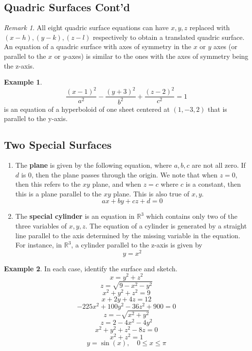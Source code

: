 \documentclass[11pt]{article}
\theoremstyle{plain} %
\theoremstyle{definition}
\theoremstyle{example}
\newtheorem*{example}{Example}
\theoremstyle{remark}
\newtheorem*{remark}{Remark}
\begin{document}
\subsection{Quadric Surfaces Cont'd}

\begin{remark}
All eight quadric surface equations can have $x,y, z$ replaced with $(x-h), (y-k), (z-l)$ respectively to obtain a translated quadric surface. An equation of a quadric surface with axes of symmetry in the $x$ or $y$ axes (or parallel to the $x$ or $y$-axes) is similar to the ones with the axes of symmetry being the z-axis.
\end{remark}

\begin{example}
$$\frac{(x-1)^2}{a^2}-\frac{(y+3)^2}{b^2}+\frac{(z-2)^2}{c^2} = 1$$ is an equation of a hyperboloid of one sheet centered at $(1, -3, 2)$ that is parallel to the y-axis.
\end{example}

\subsection{Two Special Surfaces}
\begin{enumerate}
	\item The \textbf{plane} is given by the following equation, where $a, b, c$ are not all zero. If $d$ is 0, then the plane passes through the origin. We note that when $z=0$, then this refers to the $xy$ plane, and when $z=c$ where $c$ is a constant, then this is a plane parallel to the $xy$ plane. This is also true of $x, y$.
	$$ax+by+cz+d=0$$
	\item The \textbf{special cylinder} is an equation in $\mathbb R^3$ which contains only two of the three variables of $x, y, z$. The equation of a cylinder is generated by a straight line parallel to the axis determined by the missing variable in the equation. For instance, in $\mathbb R^3$, a cylinder parallel to the z-axis is given by
	$$y = x^2$$ 
\end{enumerate}

\begin{example}
In each case, identify the surface and sketch. $$x=y^2 + z^2$$ $$z = \sqrt{9-x^2-y^2}$$ $$x^2+y^2+z^2=9$$ 
$$x+2y+4z = 12$$  $$-225x^2+100y^2-36z^2+900=0$$ $$z= -\sqrt{x^2+y^2}$$ 
$$z = 2-4x^2-4y^2$$ $$x^2 + y^2 + z^2 -8z = 0$$ $$x^2+z^2=1$$ $$y = \sin(x), \quad 0 \leq x \leq \pi$$ 
\end{example}
\end{document}
